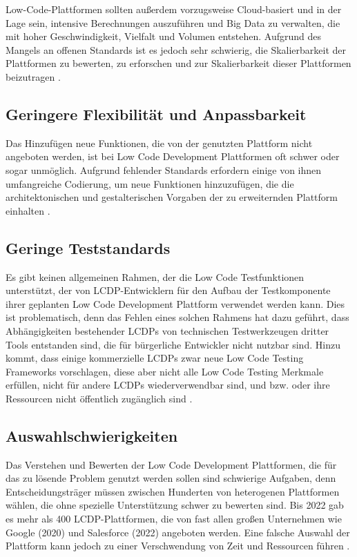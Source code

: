 \documentclass[12pt]{article} %
\begin{document}
	Low-Code-Plattformen sollten außerdem vorzugsweise Cloud-basiert und in der Lage sein, intensive Berechnungen auszuführen und Big Data zu verwalten, die mit hoher Geschwindigkeit, Vielfalt und Volumen entstehen. Aufgrund des Mangels an offenen Standards ist es jedoch sehr schwierig, die Skalierbarkeit der Plattformen zu bewerten, zu erforschen und zur Skalierbarkeit dieser Plattformen beizutragen \autocite{Alamin.2023}.
	
	\subsection{Geringere Flexibilität und Anpassbarkeit}	
	Das Hinzufügen neue Funktionen, die von der genutzten Plattform nicht angeboten werden, ist bei Low Code Development Plattformen oft schwer oder sogar unmöglich. Aufgrund fehlender Standards erfordern einige von ihnen umfangreiche Codierung, um neue Funktionen hinzuzufügen, die die architektonischen und gestalterischen Vorgaben der zu erweiternden Plattform einhalten \autocite{Alamin.2023}.
	
	\subsection{Geringe Teststandards} 
	Es gibt keinen allgemeinen Rahmen, der die Low Code Testfunktionen unterstützt, der von LCDP-Entwicklern für den Aufbau der Testkomponente ihrer geplanten Low Code Development Plattform verwendet werden kann. Dies ist problematisch, denn das Fehlen eines solchen Rahmens hat dazu geführt, dass Abhängigkeiten bestehender LCDPs von technischen Testwerkzeugen dritter Tools entstanden sind, die für bürgerliche Entwickler nicht nutzbar sind. Hinzu kommt, dass einige kommerzielle LCDPs zwar neue Low Code Testing Frameworks vorschlagen, diese aber nicht alle  Low Code Testing Merkmale erfüllen, nicht für andere LCDPs wiederverwendbar sind, und bzw. oder ihre Ressourcen nicht öffentlich zugänglich sind \autocite{Khorram.2020}.	
	
	\subsection{Auswahlschwierigkeiten}	
	Das Verstehen und Bewerten der Low Code Development Plattformen, die für das zu lösende Problem genutzt werden sollen sind schwierige Aufgaben, denn  Entscheidungsträger müssen zwischen Hunderten von heterogenen Plattformen wählen, die ohne spezielle Unterstützung schwer zu bewerten sind. Bis 2022 gab es mehr als 400 LCDP-Plattformen, die von fast allen großen Unternehmen wie Google (2020) und Salesforce (2022) angeboten werden. Eine falsche Auswahl der Plattform kann jedoch zu einer Verschwendung von Zeit und Ressourcen führen \autocite{Alamin.2023}. 
	
\end{document}
